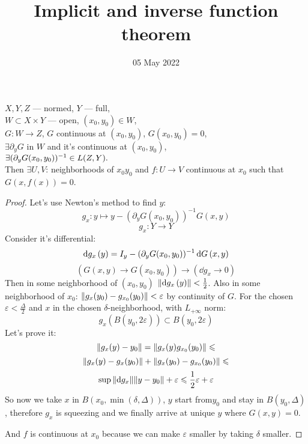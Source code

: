 
\title{Implicit and inverse function theorem}
\author{}
\date{05 May 2022}

\maketitle

\begin{thr}
$X, Y, Z$ --- normed, $Y$ --- full,\\
$W \subset X \times Y$ --- open, $(x_0, y_0) \in W$,\\
$G: W \to Z$, $G$ continuous at $(x_0, y_0)$, $G(x_0, y_0) = 0$,\\
$\exists \partial_yG$ in $W$ and it's continuous at $(x_0, y_0)$,\\
$\exists (\partial_y G\/(x_0, y_0))^{-1} \in L(Z, Y).$\\
Then $\exists U, V$: neighborhoods of $x_0 y_0$ and 
$f: U \to V$ continuous at $x_0$ such that $G(x, f(x)) = 0$.
\end{thr}
\begin{proof}
Let's use Newton's method to find $y$:
\[ g_x: y \mapsto y - (\partial_yG(x_0, y_0))^{-1}G(x, y) \]
\[ g_x: Y \to Y \]
Consider it's differential:
\[ \dd{g_x}\/(y) = I_y -  (\partial_yG(x_0, y_0))^{-1}\dd{G}\/(x, y) \]
\[ (G(x, y) \to G(x_0, y_0)) \to (\dd{g_x} \to 0) \]
Then in some neighborhood of $(x_0, y_0)$ $\norm{\dd{g_x}\/(y)} < \frac12$.
Also in some neighborhood of $x_0$: $\norm{g_x(y_0) - g_{x_0}(y_0)} < \varepsilon$ by continuity of $G$.
For the chosen $\varepsilon < \frac{\Delta}{2}$ and $x$ in the chosen $\delta$-neighborhood, with $L_{+\infty}$ norm:
\[ g_x(B(y_0, 2\varepsilon)) \subset B(y_0, 2\varepsilon) \]
Let's prove it:
\[\norm{g_x(y) - y_0} = \norm{g_x(y)  g_{x_0}(y_0)} \leqslant\]
\[\norm{g_x(y) - g_x(y_0)} + \norm{g_x(y_0) - g_{x_0}(y_0)} \leqslant\]
\[\sup\norm{\dd{g_x}} \norm{y - y_0} + \varepsilon \leqslant \frac12 \varepsilon + \varepsilon\]
So now we take $x$ in $B(x_0, \min(\delta, \Delta))$, $y$ start from$y_0$ and stay in $B(y_0, \Delta)$,
therefore $g_x$ is squeezing and we finally arrive at unique $y$ where $G(x, y) = 0$.

And $f$ is continuous at $x_0$ because we can make $\varepsilon$ smaller by taking $\delta$ smaller.
\end{proof}

